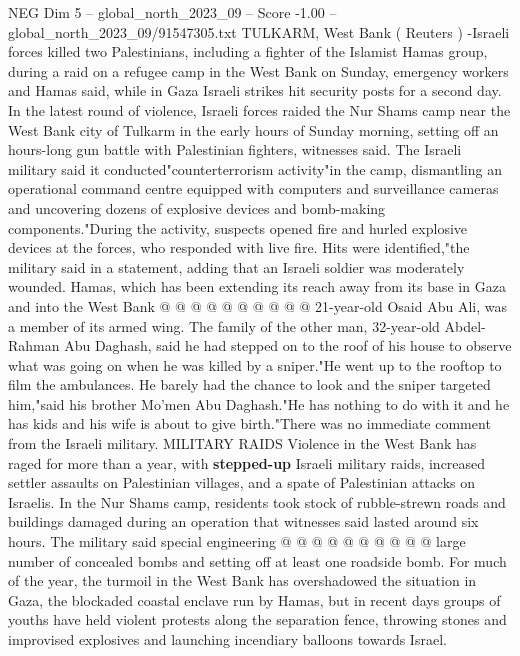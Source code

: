 \begin{textsample}{NEG Dim 5 – global\_north\_2023\_09 – Score -1.00 – global\_north\_2023\_09/91547305.txt}  \label{ex:f5_neg_011}
TULKARM, West Bank ( Reuters ) -Israeli forces killed two Palestinians, including a fighter of the Islamist Hamas group, during a raid on a refugee camp in the West Bank on Sunday, emergency workers and Hamas said, while in Gaza Israeli strikes hit security posts for a second day.
In the latest round of violence, Israeli forces raided the Nur Shams camp near the West Bank city of Tulkarm in the early hours of Sunday morning, setting off an hours-long gun battle with Palestinian fighters, witnesses said.
The Israeli military said it conducted"counterterrorism activity"in the camp, dismantling an operational command centre equipped with computers and surveillance cameras and uncovering dozens of explosive devices and bomb-making components."During the activity, suspects opened fire and hurled explosive devices at the forces, who responded with live fire.
Hits were identified,"the military said in a statement, adding that an Israeli soldier was moderately wounded.
Hamas, which has been extending its reach away from its base in Gaza and into the West Bank @ @ @ @ @ @ @ @ @ @ 21-year-old Osaid Abu Ali, was a member of its armed wing.
The family of the other man, 32-year-old Abdel-Rahman Abu Daghash, said he had stepped on to the roof of his house to observe what was going on when he was killed by a sniper."He went up to the rooftop to film the ambulances.
He barely had the chance to look and the sniper targeted him,"said his brother Mo'men Abu Daghash."He has nothing to do with it and he has kids and his wife is about to give birth."There was no immediate comment from the Israeli military.
MILITARY RAIDS Violence in the West Bank has raged for more than a year, with \textbf{stepped-up} Israeli military raids, increased settler assaults on Palestinian villages, and a spate of Palestinian attacks on Israelis.
In the Nur Shams camp, residents took stock of rubble-strewn roads and buildings damaged during an operation that witnesses said lasted around six hours.
The military said special engineering @ @ @ @ @ @ @ @ @ @ large number of concealed bombs and setting off at least one roadside bomb.
For much of the year, the turmoil in the West Bank has overshadowed the situation in Gaza, the blockaded coastal enclave run by Hamas, but in recent days groups of youths have held violent protests along the separation fence, throwing stones and improvised explosives and launching incendiary balloons towards Israel.

\end{textsample}
